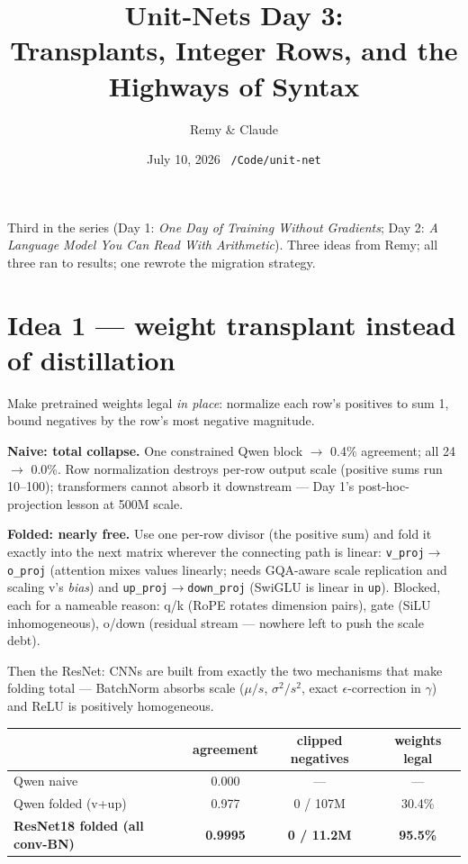 \documentclass[10pt]{article}
\title{\textbf{Unit-Nets Day 3:\\Transplants, Integer Rows, and the
Highways of Syntax}}
\author{Remy \& Claude}
\date{July 10, 2026 \quad \texttt{\small~/Code/unit-net}}
\begin{document}
\maketitle

Third in the series (Day 1: \emph{One Day of Training Without Gradients};
Day 2: \emph{A Language Model You Can Read With Arithmetic}). Three ideas
from Remy; all three ran to results; one rewrote the migration strategy.

\section{Idea 1 --- weight transplant instead of distillation}
Make pretrained weights legal \emph{in place}: normalize each row's
positives to sum 1, bound negatives by the row's most negative magnitude.

\textbf{Naive: total collapse.} One constrained Qwen block $\to$ 0.4\%
agreement; all 24 $\to$ 0.0\%. Row normalization destroys per-row output
scale (positive sums run 10--100); transformers cannot absorb it
downstream --- Day 1's post-hoc-projection lesson at 500M scale.

\textbf{Folded: nearly free.} Use one per-row divisor (the positive sum)
and fold it exactly into the next matrix wherever the connecting path is
linear: \texttt{v\_proj}$\to$\texttt{o\_proj} (attention mixes values
linearly; needs GQA-aware scale replication and scaling v's \emph{bias})
and \texttt{up\_proj}$\to$\texttt{down\_proj} (SwiGLU is linear in
\texttt{up}). Blocked, each for a nameable reason: q/k (RoPE rotates
dimension pairs), gate (SiLU inhomogeneous), o/down (residual stream ---
nowhere left to push the scale debt).

Then the ResNet: CNNs are built from exactly the two mechanisms that make
folding total --- BatchNorm absorbs scale
($\mu/s$, $\sigma^2/s^2$, exact $\epsilon$-correction in $\gamma$) and
ReLU is positively homogeneous.

\begin{center}\small\begin{tabular}{@{}lccc@{}}\toprule
 & agreement & clipped negatives & weights legal\\\midrule
Qwen naive & 0.000 & --- & ---\\
Qwen folded (v+up) & 0.977 & 0 / 107M & 30.4\%\\
\textbf{ResNet18 folded (all conv-BN)} & \textbf{0.9995} &
\textbf{0 / 11.2M} & \textbf{95.5\%}\\
\bottomrule\end{tabular}\end{center}
\end{document}
